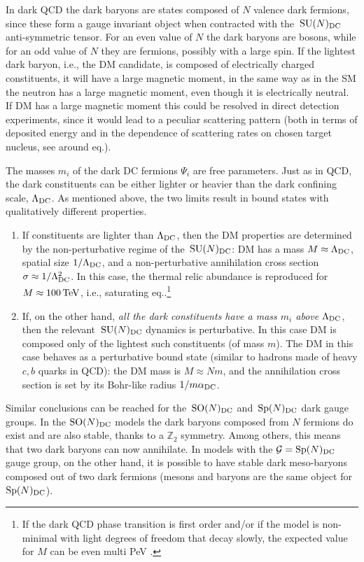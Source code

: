 In dark QCD the dark baryons are states composed of $N$ valence dark fermions, since these form a gauge invariant object when contracted with
the $\,{\rm SU}(N)_{\rm DC}$ anti-symmetric tensor.
For an even value of $N$ the dark baryons are bosons, while for an odd value of $N$ they are fermions, possibly with a large spin. 
If the lightest dark baryon, i.e., the DM candidate, is composed of electrically charged constituents, it
will have a large magnetic moment, in the same way as in the SM the  neutron has a large magnetic moment, even though it is electrically neutral. If DM has a large magnetic moment this could be resolved in direct detection experiments, since it would lead to a peculiar scattering pattern (both in terms of deposited energy and in the dependence of scattering rates on chosen target nucleus, see around eq.).

The masses $m_i$ of the dark  DC fermions $\Psi_i$ are free parameters. Just as in QCD, the dark constituents can be either lighter or heavier than the dark confining scale, $\Lambda_{\rm DC}$. 
As mentioned above, the two limits result in bound states with qualitatively different properties.
\begin{enumerate}
\item If constituents are lighter than $\Lambda_{\rm DC}$, then the DM properties are determined by the non-perturbative regime of the $\,{\rm SU}(N)_{\rm DC}$: DM has a mass $M \approx \Lambda_{\rm DC}$,
spatial size $1/\Lambda_{\rm DC}$, and
a non-perturbative annihilation cross section $\sigma \approx 1/\Lambda_{\rm DC}^2$. 
In this case, the
thermal relic abundance is reproduced for $M \approx100\,{\rm TeV}$, i.e., saturating eq..\footnote{If the dark QCD phase transition is first order and/or if the model is non-minimal with light degrees of freedom that decay slowly, the expected value for $M$ can be even multi PeV \cite{1912.02830}.}

\item
If, on the other hand, {\em all the dark constituents have a mass $m_i$  above $\Lambda_{\rm DC}$}, then the relevant $\,{\rm SU}(N)_{\rm DC}$ dynamics is perturbative. 
In this case DM is composed only of the lightest such constituents (of mass $m$).
The DM in this case behaves as a perturbative bound state
(similar to hadrons made of heavy $c,b$ quarks in QCD):
the DM mass is $M\approx N m$, 
and the annihilation cross section is set by its
Bohr-like radius $1/m\alpha_{\rm DC}$.
\end{enumerate}
Similar conclusions can be reached for the $\,{\rm SO}(N)_{\rm DC}$ and $\,{\rm Sp}(N)_{\rm DC}$ dark gauge groups. In the ${\rm SO}(N)_{\rm DC}$ models the dark baryons composed from $N$ fermions do exist and are also stable, thanks to a $\mathbb{Z}_2$ symmetry.
Among others, this means that two dark baryons can now annihilate.
In models with the $\mathcal{G}={\rm Sp}(N)_{\rm DC}$ gauge group, on the other hand, it is possible to have stable dark meso-baryons
composed out of two dark fermions
(mesons and baryons are the same object for ${\rm Sp}(N)_{\rm DC}$).


